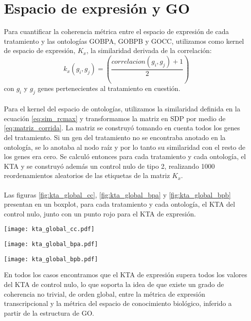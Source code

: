 \section{Espacio de expresión y GO}
Para cuantificar la coherencia métrica entre el espacio de expresión de cada tratamiento y las ontologías GOBPA, GOBPB y GOCC, utilizamos como kernel de espacio de expresión, $K_x$, la similaridad derivada de la correlación:
\begin{equation}
	k_x(g_i, g_j) = (\frac{correlacion(g_i, g_j)+1}{2})
	\label{eq:similaridad_de_correlacion}
\end{equation}
con $g_i$ y $g_j$ genes pertenecientes al tratamiento en cuestión.\\\\
Para el kernel del espacio de ontologías, utilizamos la similaridad definida en la ecuación \ref{eq:sim_rcmax} y transformamos la matriz en SDP por medio de \ref{eq:matriz_corrida}. La matriz se construyó tomando en cuenta todos los genes del tratamiento. Si un gen del tratamiento no se encontraba anotado en la ontología, se lo anotaba al nodo raíz y por lo tanto su similaridad con el resto de los genes era cero. Se calculó entonces para cada tratamiento y cada ontología, el KTA y se construyó además un control nulo de tipo 2, realizando 1000 reordenamientos aleatorios de las etiquetas de la matriz $K_x$.\\\\
Las figuras \ref{fig:kta_global_cc}, \ref{fig:kta_global_bpa} y \ref{fig:kta_global_bpb} presentan en un boxplot, para cada tratamiento y cada ontología, el KTA del control nulo, junto con un punto rojo para el KTA de expresión. 
\begin{center}
\texttt{[image: kta\_global\_cc.pdf]}
\label{fig:kta_global_cc}
\end{center}
\begin{center}
\texttt{[image: kta\_global\_bpa.pdf]}
\label{fig:kta_global_bpa}
\end{center}
\begin{center}
\texttt{[image: kta\_global\_bpb.pdf]}
\label{fig:kta_global_bpb}
\end{center}
En todos los casos encontramos que el KTA de expresión supera todos los valores del KTA de control nulo, lo que soporta la idea de que existe un grado de coherencia no trivial, de orden global, entre la métrica de expresión transcripcional y la métrica del espacio de conocimiento biológico, inferido a partir de la estructura de GO.
